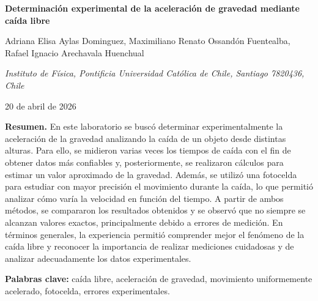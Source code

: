 \documentclass[11pt,letterpaper]{article}
\begin{document}
\thispagestyle{empty}


\begin{center}
    {\fontsize{14}{16}\selectfont\bfseries 
    Determinación experimental de la aceleración de gravedad mediante caída libre}
    
    \vspace{0.3cm}
    
    {\normalsize
    Adriana Elisa Aylas Dominguez, Maximiliano Renato Ossandón Fuentealba,\\
    Rafael Ignacio Arechavala Huenchual}
    
    \vspace{0.2cm}
    
    {\small\itshape
    Instituto de Física, Pontificia Universidad Católica de Chile, Santiago 7820436, Chile}
    
    \vspace{0.2cm}
    
    {\small 20 de abril de 2026}
\end{center}

\vspace{0.3cm}

\noindent\textbf{Resumen.} En este laboratorio se buscó determinar experimentalmente la aceleración de la gravedad analizando la caída de un objeto desde distintas alturas. Para ello, se midieron varias veces los tiempos de caída con el fin de obtener datos más confiables y, posteriormente, se realizaron cálculos para estimar un valor aproximado de la gravedad.
Además, se utilizó una fotocelda para estudiar con mayor precisión el movimiento durante la caída, lo que permitió analizar cómo varía la velocidad en función del tiempo. A partir de ambos métodos, se compararon los resultados obtenidos y se observó que no siempre se alcanzan valores exactos, principalmente debido a errores de medición.
En términos generales, la experiencia permitió comprender mejor el fenómeno de la caída libre y reconocer la importancia de realizar mediciones cuidadosas y de analizar adecuadamente los datos experimentales.

\vspace{0.2cm}

\noindent\textbf{Palabras clave:} caída libre, aceleración de gravedad, movimiento uniformemente acelerado, fotocelda, errores experimentales.
\end{document}
